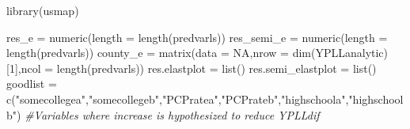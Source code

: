 \documentclass[
]{article}
\newenvironment{Shaded}{\begin{snugshade}}{\end{snugshade}}
\newcommand{\AttributeTok}[1]{\textcolor[rgb]{0.77,0.63,0.00}{#1}}
\newcommand{\CommentTok}[1]{\textcolor[rgb]{0.56,0.35,0.01}{\textit{#1}}}
\newcommand{\ConstantTok}[1]{\textcolor[rgb]{0.00,0.00,0.00}{#1}}
\newcommand{\DecValTok}[1]{\textcolor[rgb]{0.00,0.00,0.81}{#1}}
\newcommand{\FunctionTok}[1]{\textcolor[rgb]{0.00,0.00,0.00}{#1}}
\newcommand{\NormalTok}[1]{#1}
\newcommand{\OtherTok}[1]{\textcolor[rgb]{0.56,0.35,0.01}{#1}}
\newcommand{\StringTok}[1]{\textcolor[rgb]{0.31,0.60,0.02}{#1}}
\begin{document}
\begin{Shaded}
\begin{Highlighting}[]
\FunctionTok{library}\NormalTok{(usmap)}

\NormalTok{res\_e }\OtherTok{=} \FunctionTok{numeric}\NormalTok{(}\AttributeTok{length =} \FunctionTok{length}\NormalTok{(predvarls))}
\NormalTok{res\_semi\_e }\OtherTok{=} \FunctionTok{numeric}\NormalTok{(}\AttributeTok{length =} \FunctionTok{length}\NormalTok{(predvarls))}
\NormalTok{county\_e }\OtherTok{=} \FunctionTok{matrix}\NormalTok{(}\AttributeTok{data =} \ConstantTok{NA}\NormalTok{,}\AttributeTok{nrow =} \FunctionTok{dim}\NormalTok{(YPLLanalytic)[}\DecValTok{1}\NormalTok{],}\AttributeTok{ncol =} \FunctionTok{length}\NormalTok{(predvarls))}
\NormalTok{res.elastplot }\OtherTok{=} \FunctionTok{list}\NormalTok{()}
\NormalTok{res.semi\_elastplot }\OtherTok{=} \FunctionTok{list}\NormalTok{()}
\NormalTok{goodlist }\OtherTok{=} \FunctionTok{c}\NormalTok{(}\StringTok{"somecollegea"}\NormalTok{,}\StringTok{"somecollegeb"}\NormalTok{,}\StringTok{"PCPratea"}\NormalTok{,}\StringTok{"PCPrateb"}\NormalTok{,}\StringTok{"highschoola"}\NormalTok{,}\StringTok{"highschoolb"}\NormalTok{) }\CommentTok{\#Variables where increase is hypothesized to reduce YPLLdif}


\end{Highlighting}
\end{Shaded}
\end{document}
